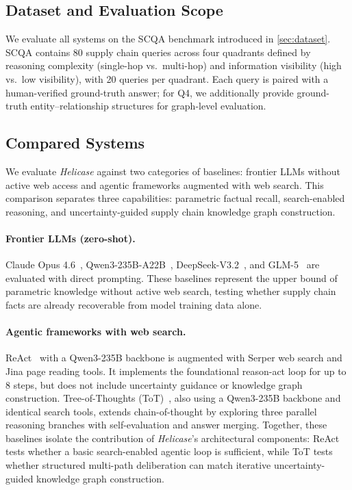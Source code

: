 \documentclass{article}
\begin{document}
\subsection{Dataset and Evaluation Scope}

We evaluate all systems on the SCQA benchmark introduced in \autoref{sec:dataset}. SCQA contains 80 supply chain queries across four quadrants defined by reasoning complexity (single-hop vs.\ multi-hop) and information visibility (high vs.\ low visibility), with 20 queries per quadrant. Each query is paired with a human-verified ground-truth answer; for Q4, we additionally provide ground-truth entity--relationship structures for graph-level evaluation.

\subsection{Compared Systems}

We evaluate \textit{Helicase} against two categories of baselines: frontier LLMs without active web access and agentic frameworks augmented with web search. This comparison separates three capabilities: parametric factual recall, search-enabled reasoning, and uncertainty-guided supply chain knowledge graph construction.

\paragraph{Frontier LLMs (zero-shot).}
Claude Opus 4.6~\citep{anthropic2025claude}, Qwen3-235B-A22B~\citep{qwen2025qwen3}, DeepSeek-V3.2~\citep{deepseek2025v3}, and GLM-5~\citep{glm2024chatglm} are evaluated with direct prompting. These baselines represent the upper bound of parametric knowledge without active web search, testing whether supply chain facts are already recoverable from model training data alone.

\paragraph{Agentic frameworks with web search.}
ReAct~\citep{yao2023react} with a Qwen3-235B backbone is augmented with Serper web search and Jina page reading tools. It implements the foundational reason-act loop for up to 8 steps, but does not include uncertainty guidance or knowledge graph construction. Tree-of-Thoughts (ToT)~\citep{yao2023tot}, also using a Qwen3-235B backbone and identical search tools, extends chain-of-thought by exploring three parallel reasoning branches with self-evaluation and answer merging. Together, these baselines isolate the contribution of \textit{Helicase}'s architectural components: ReAct tests whether a basic search-enabled agentic loop is sufficient, while ToT tests whether structured multi-path deliberation can match iterative uncertainty-guided knowledge graph construction.
\end{document}
